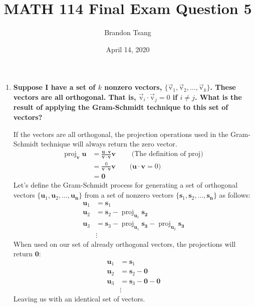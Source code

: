 \documentclass[11pt]{article}
\title{MATH 114 Final Exam Question 5}
\author{Brandon Tsang}
\date{April 14, 2020}
\DeclareMathOperator{\proj}{proj}
\begin{document}
    \maketitle
    \begin{enumerate}[label=\textbf{\arabic*.}, start=5]
        \item{
            \textbf{\boldmath Suppose I have a set of \(k\) nonzero vectors, \(\{\vec{\mathrm v}_1,\vec{\mathrm v}_2,\ldots,\vec{\mathrm v}_k\}\). These vectors are all orthogonal. That is, \(\vec{\mathrm v}_i\cdot\vec{\mathrm v}_j=0\) if \(i\neq j\). What is the result of applying the Gram-Schmidt technique to this set of vectors?}
            \par
            If the vectors are all orthogonal, the projection operations used in the Gram-Schmidt technique will always return the zero vector.
            \begin{align*}
                \proj_\mathbf{v}\mathbf{u}&=\frac{\mathbf{u}\cdot\mathbf{v}}{\mathbf{v}\cdot\mathbf{v}}\mathbf{v}\qquad\text{(The definition of \(\proj\))} \\
                &=\frac{0}{\mathbf{v}\cdot\mathbf{v}}\mathbf{v}\qquad\text{(\(\mathbf{u}\cdot\mathbf{v}=0\))} \\
                &=\mathbf{0}
            \end{align*}
            Let's define the Gram-Schmidt process for generating a set of orthogonal vectors \(\{\mathbf{u}_1,\mathbf{u}_2,\ldots,\mathbf{u_n}\}\) from a set of nonzero vectors \(\{\mathbf{s}_1,\mathbf{s}_2,\ldots,\mathbf{s_n}\}\) as follows:
            \begin{align*}
                \mathbf{u}_1&=\mathbf{s}_1 \\
                \mathbf{u}_2&=\mathbf{s}_2-\proj_{\mathbf{u}_1}\mathbf{s_2} \\
                \mathbf{u}_3&=\mathbf{s}_3-\proj_{\mathbf{u}_1}\mathbf{s_3}-\proj_{\mathbf{u}_2}\mathbf{s_3} \\
                &\vdots
            \end{align*}
            When used on our set of already orthogonal vectors, the projections will return \(\mathbf{0}\):
            \begin{align*}
                \mathbf{u}_1&=\mathbf{s}_1 \\
                \mathbf{u}_2&=\mathbf{s}_2-\mathbf{0} \\
                \mathbf{u}_3&=\mathbf{s}_3-\mathbf{0}-\mathbf{0} \\
                &\vdots
            \end{align*}
            Leaving us with an identical set of vectors.
        }
    \end{enumerate}
\end{document}
